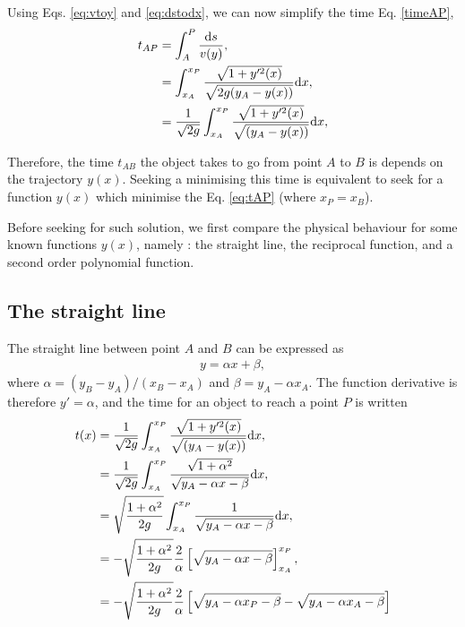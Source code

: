 \documentclass{article}
\begin{document}
Using Eqs. \eqref{eq:vtoy} and \eqref{eq:dstodx}, we can now simplify the time Eq. \eqref{timeAP},
\begin{align}
t_{AP} &= \int_A^P \frac{\text d s }{v(y)},\nonumber\\
&= \int_{x_A}^{x_P} \frac{\sqrt{1 + y'^2(x)}}{\sqrt{2 g(y_A - y(x))}} \text d x,\nonumber\\
&= \frac 1{\sqrt{2 g}} \int_{x_A}^{x_P} \frac{\sqrt{1 + y'^2(x)}}{\sqrt{(y_A - y(x))}} \text d x, \label{eq:tAP}
\end{align}

Therefore, the time $t_{AB}$ the object takes to go from point $A$ to $B$ is depends on the trajectory $y(x)$. Seeking a minimising this time is equivalent to seek for a function $y(x)$ which minimise the Eq. \eqref{eq:tAP} (where $x_P = x_B$).

Before seeking for such solution, we first compare the physical behaviour for some known functions $y(x)$, namely : the straight line, the reciprocal function, and a second order polynomial function.

\subsection*{The straight line}

The straight line between point $A$ and $B$ can be expressed as
\begin{align}
y = \alpha x + \beta,
\end{align}
where $\alpha = (y_B-y_A)/(x_B - x_A)$ and $\beta = y_A - \alpha x_A$. The function derivative is therefore $y' = \alpha$, and the time for an object to reach a point $P$ is written
\begin{align}
t(x) &= \frac 1{\sqrt{2 g}} \int_{x_A}^{x_P} \frac{\sqrt{1 + y'^2(x)}}{\sqrt{(y_A - y(x))}} \text d x,\nonumber\\
&= \frac 1{\sqrt{2 g}} \int_{x_A}^{x_P} \frac{\sqrt{1 + \alpha^2}}{\sqrt{y_A - \alpha x - \beta }} \text d x,\nonumber\\
&=  \sqrt{\frac{1 + \alpha^2}{2 g}} \int_{x_A}^{x_P} \frac{1}{\sqrt{y_A - \alpha x - \beta }} \text d x,\nonumber\\
&=  - \sqrt{\frac{1 + \alpha^2}{2 g}} \frac 2 \alpha \left[ \sqrt{y_A - \alpha x - \beta }  \right]_{x_A}^{x_P},\nonumber\\
&=  - \sqrt{\frac{1 + \alpha^2}{2 g}} \frac 2 \alpha \left[ \sqrt{y_A - \alpha x_P - \beta } - \sqrt{y_A - \alpha x_A - \beta }  \right]\label{eq:tAP_straight}
\end{align}
\end{document}
